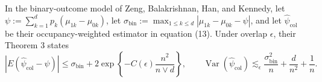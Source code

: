 In the binary-outcome model of Zeng, Balakrishnan, Han, and Kennedy, let \(\psi:=\sum_{k=1}^dp_k(\mu_{1k}-\mu_{0k})\), let \(\sigma_{\mathrm{bin}}:=\max_{1\le k\le d}|\mu_{1k}-\mu_{0k}-\psi|\), and let \(\widehat\psi_{\mathrm{col}}\) be their occupancy-weighted estimator in equation (13).  Under overlap \(\epsilon\), their Theorem 3 states
\[
 |E(\widehat\psi_{\mathrm{col}}-\psi)|
 \le \sigma_{\mathrm{bin}}+2\exp\left\{-C(\epsilon)\frac{n^2}{n\vee d}\right\},
 \qquad
 \operatorname{Var}(\widehat\psi_{\mathrm{col}})
 \lesssim_{\epsilon}\frac{\sigma_{\mathrm{bin}}^2}{n}+\frac d{n^2}+\frac1n.
\]